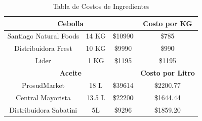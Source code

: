 \documentclass[12pt]{article}
\begin{document}
\begin{table}[h!]
\begin{tabular}{|| c | c | c | c||}
        \multicolumn{3}{||c|}{\textbf{Cebolla}} & \textbf{Costo por KG} \\ [0.5ex] \hline \hline %
        Santiago Natural Foods & 14 KG & \$10990 & \$785 \\ \hline
        Distribuidora Frest & 10 KG & \$9990 & \$990 \\ \hline
        Lider & 1 KG & \$1195 & \$1195 \\ [1ex] \hline \hline

        \multicolumn{3}{||c|}{\textbf{Aceite}} & \textbf{Costo por Litro} \\ [0.5ex] \hline \hline
        ProsudMarket & 18 L & \$39614 & \$2200.77 \\ \hline
        Central Mayorista & 13.5 L & \$22200 & \$1644.44 \\ \hline
        Distribuidora Sabatini & 5L & \$9296 & \$1859.20 \\ [1ex] \hline \hline

    \end{tabular}
    \caption{Tabla de Costos de Ingredientes}
    \label{tab:costos_ingredientes}
\end{table} %
\newpage
\end{document}
